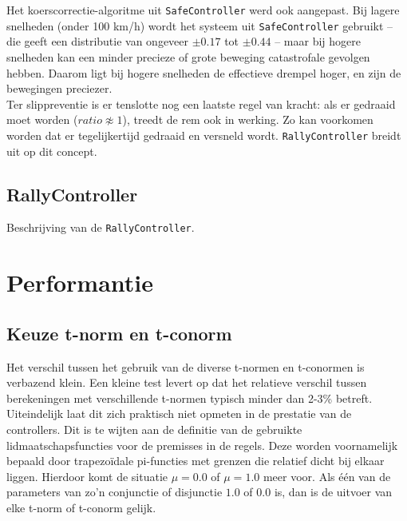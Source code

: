 \documentclass[10pt,a4paper]{article}
\begin{document}
			Het koerscorrectie-algoritme uit \texttt{SafeController} werd ook aangepast. Bij lagere snelheden (onder 100 km/h) wordt het systeem uit \texttt{SafeController} gebruikt -- die geeft een distributie van ongeveer $\pm 0.17$ tot $\pm 0.44$ -- maar bij hogere snelheden kan een minder precieze of grote beweging catastrofale gevolgen hebben. Daarom ligt bij hogere snelheden de effectieve drempel hoger, en zijn de bewegingen preciezer.\\

			Ter slippreventie is er tenslotte nog een laatste regel van kracht: als er gedraaid moet worden ($ratio \not\approx 1$), treedt de rem ook in werking. Zo kan voorkomen worden dat er tegelijkertijd gedraaid en versneld wordt. \texttt{RallyController} breidt uit op dit concept.

		\subsection{RallyController}
			Beschrijving van de \texttt{RallyController}.

	\section{Performantie}
		\subsection{Keuze t-norm en t-conorm}
			Het verschil tussen het gebruik van de diverse t-normen en t-conormen is verbazend klein. Een kleine test levert op dat het relatieve verschil tussen berekeningen met verschillende t-normen typisch minder dan 2-3\% betreft. Uiteindelijk laat dit zich praktisch niet opmeten in de prestatie van de controllers. Dit is te wijten aan de definitie van de gebruikte lidmaatschapsfuncties voor de premisses in de regels. Deze worden voornamelijk bepaald door trapezo\"idale pi-functies met grenzen die relatief dicht bij elkaar liggen. Hierdoor komt de situatie $\mu = 0.0$ of $\mu = 1.0$ meer voor. Als \'e\'en van de parameters van zo'n conjunctie of disjunctie $1.0$ of $0.0$ is, dan is de uitvoer van elke t-norm of t-conorm gelijk.\\
\end{document}

